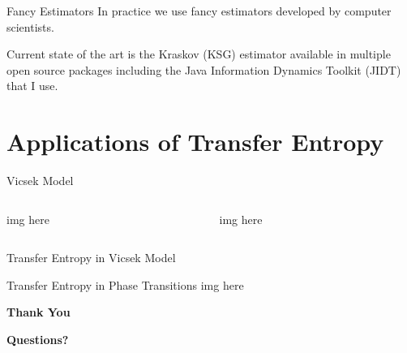 \documentclass{cubeamer}
\begin{document}
\begin{frame}{Fancy Estimators}
    In practice we use fancy estimators developed by computer scientists.
    
    Current state of the art is the Kraskov (KSG) estimator available in multiple open source packages including the Java Information Dynamics Toolkit (JIDT) that I use.
\end{frame}

\section{Applications of Transfer Entropy}

\begin{frame}{Vicsek Model}
    \begin{columns}
        \begin{column}{0.5\textwidth}
            img here
        \end{column}
        \begin{column}{0.5\textwidth}
            img here
        \end{column}
    \end{columns}
\end{frame}

\begin{frame}{Transfer Entropy in Vicsek Model}
\end{frame}

\begin{frame}{Transfer Entropy in Phase Transitions}
    img here
\end{frame}
    

\begin{frame}[standout]
    \centering
    \Huge\textbf{Thank You}
    
    \vfill
    
    \LARGE\textbf{Questions?}
\end{frame}
\end{document}
